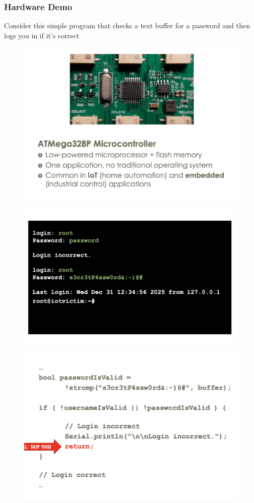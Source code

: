\documentclass[../notes.tex]{subfiles}
\begin{document}
\subsubsection{Hardware Demo}


Consider this simple program that checks a text buffer for a password and then logs you in if it's correct

\begin{figure}[H]
    \centering
    \includegraphics[width=0.8\linewidth]{img/image_2023-01-23-19-44-00.png}
\end{figure}

\begin{figure}[H]
    \centering
    \includegraphics[width=0.8\linewidth]{img/image_2023-01-23-19-44-33.png}
\end{figure}
\begin{figure}[H]
    \centering
    \includegraphics[width=0.8\linewidth]{img/image_2023-01-23-19-44-46.png}
\end{figure}
\end{document}
